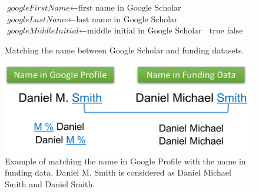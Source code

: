 \begin{figure}
\begin{algorithm}[H]
\caption{Matching the name between Google Scholar and funding datasets.}
\begin{algorithmic}[1]
\State $\textit{googleFirstName} \gets \text{first name in Google Scholar }$
\State $\textit{googleLastName} \gets \text{last name in Google Scholar }$
\State $\textit{googleMiddleInitial} \gets \text{middle initial in Google Scholar }$
{\Return true}
\EndIf
\EndIf
\EndIf
\Return false
\EndProcedure
\label{algorithm}
\end{algorithmic}
\end{algorithm}
\end{figure}



\begin{figure}[H]
\begin{center}
  \includegraphics[width=.9\textwidth]{figures/fig-name-dis-example2}
\caption{Example of matching the name in Google Profile with the name in funding data. Daniel M. Smith is considered as Daniel Michael Smith and Daniel Smith.}
\label{alg-example}
\end{center}
\end{figure}




